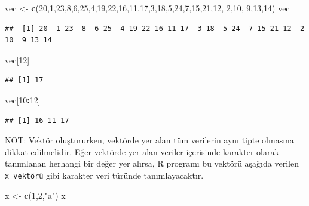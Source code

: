 \documentclass[
]{book}
\newenvironment{Shaded}{\begin{snugshade}}{\end{snugshade}}
\newcommand{\DecValTok}[1]{\textcolor[rgb]{0.00,0.00,0.81}{#1}}
\newcommand{\FunctionTok}[1]{\textcolor[rgb]{0.13,0.29,0.53}{\textbf{#1}}}
\newcommand{\NormalTok}[1]{#1}
\newcommand{\OtherTok}[1]{\textcolor[rgb]{0.56,0.35,0.01}{#1}}
\newcommand{\SpecialCharTok}[1]{\textcolor[rgb]{0.81,0.36,0.00}{\textbf{#1}}}
\newcommand{\StringTok}[1]{\textcolor[rgb]{0.31,0.60,0.02}{#1}}
\begin{document}
\begin{Shaded}
\begin{Highlighting}[]
\NormalTok{vec }\OtherTok{\textless{}{-}} \FunctionTok{c}\NormalTok{(}\DecValTok{20}\NormalTok{,}\DecValTok{1}\NormalTok{,}\DecValTok{23}\NormalTok{,}\DecValTok{8}\NormalTok{,}\DecValTok{6}\NormalTok{,}\DecValTok{25}\NormalTok{,}\DecValTok{4}\NormalTok{,}\DecValTok{19}\NormalTok{,}\DecValTok{22}\NormalTok{,}\DecValTok{16}\NormalTok{,}\DecValTok{11}\NormalTok{,}\DecValTok{17}\NormalTok{,}\DecValTok{3}\NormalTok{,}\DecValTok{18}\NormalTok{,}\DecValTok{5}\NormalTok{,}\DecValTok{24}\NormalTok{,}\DecValTok{7}\NormalTok{,}\DecValTok{15}\NormalTok{,}\DecValTok{21}\NormalTok{,}\DecValTok{12}\NormalTok{, }\DecValTok{2}\NormalTok{,}\DecValTok{10}\NormalTok{, }\DecValTok{9}\NormalTok{,}\DecValTok{13}\NormalTok{,}\DecValTok{14}\NormalTok{)}
\NormalTok{vec}
\end{Highlighting}
\end{Shaded}

\begin{verbatim}
##  [1] 20  1 23  8  6 25  4 19 22 16 11 17  3 18  5 24  7 15 21 12  2 10  9 13 14
\end{verbatim}

\begin{Shaded}
\begin{Highlighting}[]
\NormalTok{vec[}\DecValTok{12}\NormalTok{]}
\end{Highlighting}
\end{Shaded}

\begin{verbatim}
## [1] 17
\end{verbatim}

\begin{Shaded}
\begin{Highlighting}[]
\NormalTok{vec[}\DecValTok{10}\SpecialCharTok{:}\DecValTok{12}\NormalTok{]}
\end{Highlighting}
\end{Shaded}

\begin{verbatim}
## [1] 16 11 17
\end{verbatim}

NOT: Vektör oluştururken, vektörde yer alan tüm verilerin aynı tipte olmasına dikkat edilmelidir. Eğer vektörde yer alan veriler içerisinde karakter olarak tanımlanan herhangi bir değer yer alırsa, R programı bu vektörü aşağıda verilen \texttt{x\ vektörü} gibi karakter veri türünde tanımlayacaktır.

\begin{Shaded}
\begin{Highlighting}[]
\NormalTok{x }\OtherTok{\textless{}{-}} \FunctionTok{c}\NormalTok{(}\DecValTok{1}\NormalTok{,}\DecValTok{2}\NormalTok{,}\StringTok{"a"}\NormalTok{)}
\NormalTok{x}
\end{Highlighting}
\end{Shaded}
\end{document}
